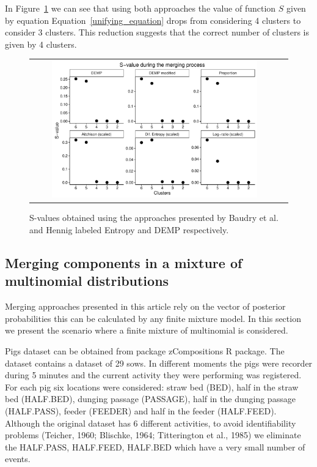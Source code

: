 \documentclass[10pt, a4paper]{article}
\newcommand{\pkg}[1]{{\fontseries{b}\selectfont #1}}
\begin{document}
\begin{spacing}{1.9}
In Figure~\ref{gaussian_Svalues} we can see that using both approaches the value of function $S$ given by equation Equation~\ref{unifying_equation} drops from considering 4 clusters to consider 3 clusters. This reduction suggests that the correct number of clusters is given by 4 clusters.
\begin{figure}[t]
\begin{center}
\begin{tabular}{cc}
  \includegraphics[width=0.85\textwidth]{figures/gaussian_Svalues.pdf} \\
 \end{tabular}
 \caption{S-values obtained using the approaches presented by Baudry et al. and Hennig labeled Entropy and DEMP respectively.}\label{gaussian_Svalues}
\end{center}
\end{figure}

\subsection{Merging components in a mixture of multinomial distributions}

Merging approaches presented in this article rely on the vector of posterior probabilities this can be calculated by any finite mixture model. In this section we present the scenario where a finite mixture of multinomial is considered.

Pigs dataset can be obtained from package \pkg{zCompositions} R package. The dataset contains a dataset of 29 sows. In different moments the pigs were recorder during 5 minutes and the current activity they were performing was registered. For each pig six locations were considered: straw bed (BED), half in the straw bed (HALF.BED), dunging passage (PASSAGE), half in the dunging passage (HALF.PASS), feeder (FEEDER) and half in the feeder (HALF.FEED). Although the original dataset has 6 different activities, to avoid identifiability problems (Teicher, 1960; Blischke, 1964; Titterington et al., 1985) we eliminate the HALF.PASS, HALF.FEED, HALF.BED which have a very small number of events.


\end{spacing}
\end{document}
